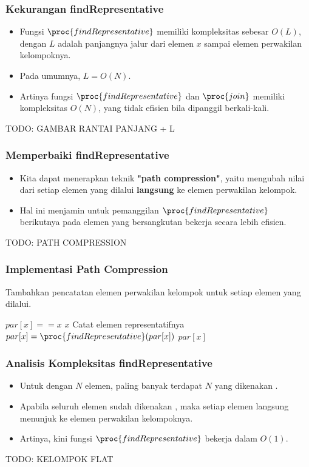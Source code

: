 \begin{frame}
\frametitle{Kekurangan findRepresentative}
\begin{itemize}
  \item Fungsi $\proc{findRepresentative}$ memiliki kompleksitas sebesar $O(L)$, dengan $L$ adalah panjangnya jalur dari elemen $x$ sampai elemen perwakilan kelompoknya.
  \item Pada umumnya, $L = O(N)$.
  \item Artinya fungsi $\proc{findRepresentative}$ dan $\proc{join}$ memiliki kompleksitas $O(N)$, yang tidak efisien bila dipanggil berkali-kali.
\end{itemize}
TODO: GAMBAR RANTAI PANJANG + L
\end{frame}

\begin{frame}
\frametitle{Memperbaiki findRepresentative}
\begin{itemize}
  \item Kita dapat menerapkan teknik \textbf{"path compression"}, yaitu mengubah nilai  dari setiap elemen yang dilalui \textbf{langsung} ke elemen perwakilan kelompok.
  \item Hal ini menjamin untuk pemanggilan $\proc{findRepresentative}$ berikutnya pada elemen yang bersangkutan bekerja secara lebih efisien.
\end{itemize}
TODO: PATH COMPRESSION
\end{frame}

\begin{frame}
\frametitle{Implementasi Path Compression}
Tambahkan pencatatan elemen perwakilan kelompok untuk setiap elemen yang dilalui.
\begin{codebox}
\li \If $par[x] == x$ \Then
\li   \Return $x$
\li \Else
\li   \Comment Catat elemen representatifnya
\li   $par[x] = \proc{findRepresentative}(par[x])$ 
\li   \Return $par[x]$
    \End
\end{codebox}
\end{frame}

\begin{frame}
\frametitle{Analisis Kompleksitas findRepresentative}
\begin{itemize}
  \item Untuk \pdjs dengan $N$ elemen, paling banyak terdapat $N$  yang dikenakan .
  \item Apabila seluruh  elemen sudah dikenakan , maka setiap elemen langsung menunjuk ke elemen perwakilan kelompoknya.
  \item Artinya, kini fungsi $\proc{findRepresentative}$ bekerja dalam $O(1)$.
\end{itemize}
TODO: KELOMPOK FLAT
\end{frame}

